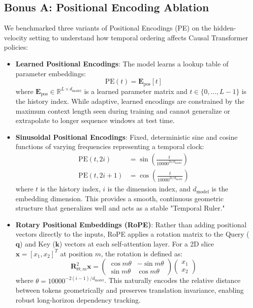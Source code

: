 \documentclass[11pt,a4paper]{article}
\begin{document}
\subsection{Bonus A: Positional Encoding Ablation}
We benchmarked three variants of Positional Encodings (PE) on the hidden-velocity setting to understand how temporal ordering affects Causal Transformer policies:
\begin{itemize}
    \item \textbf{Learned Positional Encodings}: The model learns a lookup table of parameter embeddings:
    \begin{equation}
    \text{PE}(t) = \mathbf{E}_{\text{pos}}[t]
    \end{equation}
    where $\mathbf{E}_{\text{pos}} \in \mathbb{R}^{L \times d_{\text{model}}}$ is a learned parameter matrix and $t \in \{0, \dots, L-1\}$ is the history index. While adaptive, learned encodings are constrained by the maximum context length seen during training and cannot generalize or extrapolate to longer sequence windows at test time.
    \item \textbf{Sinusoidal Positional Encodings}: Fixed, deterministic sine and cosine functions of varying frequencies representing a temporal clock:
    \begin{equation}
    \begin{aligned}
    \text{PE}(t, 2i) &= \sin\left(\frac{t}{10000^{2i / d_{\text{model}}}}\right) \\
    \text{PE}(t, 2i+1) &= \cos\left(\frac{t}{10000^{2i / d_{\text{model}}}}\right)
    \end{aligned}
    \end{equation}
    where $t$ is the history index, $i$ is the dimension index, and $d_{\text{model}}$ is the embedding dimension. This provides a smooth, continuous geometric structure that generalizes well and acts as a stable "Temporal Ruler."
    \item \textbf{Rotary Positional Embeddings (RoPE)}: Rather than adding positional vectors directly to the inputs, RoPE applies a rotation matrix to the Query ($\mathbf{q}$) and Key ($\mathbf{k}$) vectors at each self-attention layer. For a 2D slice $\mathbf{x} = [x_1, x_2]^T$ at position $m$, the rotation is defined as:
    \begin{equation}
    \mathbf{R}_{\Theta, m}^{2} \mathbf{x} = \begin{pmatrix} \cos m\theta & -\sin m\theta \\ \sin m\theta & \cos m\theta \end{pmatrix} \begin{pmatrix} x_1 \\ x_2 \end{pmatrix}
    \end{equation}
    where $\theta = 10000^{-2(i-1)/d_{\text{model}}}$. This naturally encodes the relative distance between tokens geometrically and preserves translation invariance, enabling robust long-horizon dependency tracking.
\end{itemize}
\end{document}
